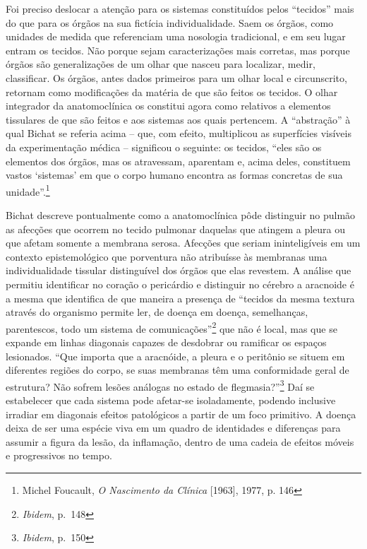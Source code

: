 Foi preciso deslocar a atenção para os sistemas constituídos pelos
``tecidos'' mais do que para os órgãos na sua fictícia individualidade.
Saem os órgãos, como unidades de medida que referenciam uma nosologia
tradicional, e em seu lugar entram os tecidos. Não porque sejam
caracterizações mais corretas, mas porque órgãos são generalizações de
um olhar que nasceu para localizar, medir, classificar. Os órgãos, antes
dados primeiros para um olhar local e circunscrito, retornam como
modificações da matéria de que são feitos os tecidos. O olhar integrador
da anatomoclínica os constitui agora como relativos a elementos
tissulares de que são feitos e aos sistemas aos quais pertencem. A
``abstração'' à qual Bichat se referia acima -- que, com efeito,
multiplicou as superfícies visíveis da experimentação médica --
significou o seguinte: os tecidos, ``eles são os elementos dos órgãos,
mas os atravessam, aparentam e, acima deles, constituem vastos
`sistemas' em que o corpo humano encontra as formas concretas de sua
unidade''.\footnote{Michel Foucault, \emph{O Nascimento da Clínica}
  {[}1963{]}, 1977, p. 146}

Bichat descreve pontualmente como a anatomoclínica pôde distinguir no
pulmão as afecções que ocorrem no tecido pulmonar daquelas que atingem a
pleura ou que afetam somente a membrana serosa. Afecções que seriam
ininteligíveis em um contexto epistemológico que porventura não
atribuísse às membranas uma individualidade tissular distinguível dos
órgãos que elas revestem. A análise que permitiu identificar no coração
o pericárdio e distinguir no cérebro a aracnoide é a mesma que
identifica de que maneira a presença de ``tecidos da mesma textura
através do organismo permite ler, de doença em doença, semelhanças,
parentescos, todo um sistema de comunicações''\footnote{\emph{Ibidem},
  p.~148} que não é local, mas que se expande em linhas diagonais
capazes de desdobrar ou ramificar os espaços lesionados. ``Que importa
que a aracnóide, a pleura e o peritônio se situem em diferentes regiões
do corpo, se suas membranas têm uma conformidade geral de estrutura? Não
sofrem lesões análogas no estado de flegmasia?''\footnote{\emph{Ibidem},
  p.~150} Daí se estabelecer que cada sistema pode afetar-se
isoladamente, podendo inclusive irradiar em diagonais efeitos
patológicos a partir de um foco primitivo. A doença deixa de ser uma
espécie viva em um quadro de identidades e diferenças para assumir a
figura da lesão, da inflamação, dentro de uma cadeia de efeitos móveis e
progressivos no tempo.

